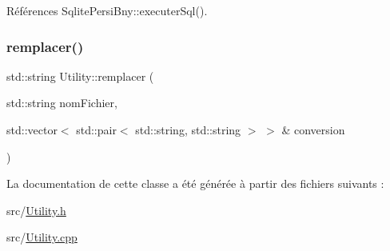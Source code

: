 Références Sqlite\+Persi\+Bny\+::executer\+Sql().

\mbox{\label{classUtility_a954a0d1bb807e5aa0c3d7c7d1059c5fb}} 
\subsubsection{\texorpdfstring{remplacer()}{remplacer()}}
{\footnotesize\ttfamily std\+::string Utility\+::remplacer (\begin{DoxyParamCaption}\item[{std\+::string}]{nom\+Fichier,  }\item[{std\+::vector$<$ std\+::pair$<$ std\+::string, std\+::string $>$ $>$ \&}]{conversion }\end{DoxyParamCaption})\hspace{0.3cm}{\ttfamily [static]}}



La documentation de cette classe a été générée à partir des fichiers suivants \+:\begin{DoxyCompactItemize}
\item 
src/\hyperlink{Utility_8h}{Utility.\+h}\item 
src/\hyperlink{Utility_8cpp}{Utility.\+cpp}\end{DoxyCompactItemize}
